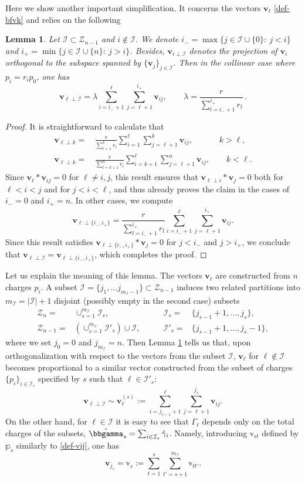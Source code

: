 \documentclass[12pt,letterpaper]{JHEP3}
\def\be{\begin{equation}}
\def\ee{\end{equation}}
\newtheorem{lemma}{Lemma}
\def\({\left(}
\def\){\right)}
\newcommand{\cI}{\mathcal{I}}
\def\Zv{\mathscr{Z}}
\newcommand{\bfv}{{\boldsymbol v}}
\def\hgam{\hat\gamma}
\def\bbp{\mathbb{p}}
\def\bbv{\mathbb{v}}
\def\mI{m_\cI}
\def\hbbgam{\hat\bbgamma}
\begin{document}
Here we show another important simplification. It concerns the vectors $\bfv_\ell$ \eqref{def-bfvk} and relies on the following
\begin{lemma}
	\label{lemma1}
	Let $\cI\subset \Zv_{n-1}$ and $i\notin \cI$. We denote $i_-=\max\{j\in \cI\cup\{0\}:\ j<i\}$
	and $i_+=\min\{j\in \cI\cup\{n\}:\ j>i\}$. Besides, $\bfv_{i\perp \cI}$ denotes the projection of $\bfv_i$ 
	orthogonal to the subspace spanned by $\{\bfv_j\}_{j\in\cI}$.	
	Then in the collinear case where $p_i=r_ip_0$, one has 
	\be
	\bfv_{\ell\perp \cI}=\lambda \sum_{i=i_-+1}^\ell\sum_{j=\ell+1}^{i_+}\bfv_{ij},
	\qquad 
	\lambda=\frac{r}{\sum_{l=i_-+1}^{i_+}r_l}\, .
	\ee
\end{lemma}
\begin{proof}
	It is straightforward to calculate that 
	\be
	\begin{split}
		\bfv_{\ell\perp k} =&\, \frac{r}{\sum_{l=1}^k r_l}\sum_{i=1}^\ell \sum_{j=\ell+1}^k \bfv_{ij},
		\qquad\quad \
		k>\ell,
		\\  
		\bfv_{\ell\perp k} =&\, \frac{r}{\sum_{l=k+1}^n r_l}\sum_{i=k+1}^\ell \sum_{j=\ell+1}^n \bfv_{ij},
		\qquad 
		k<\ell. 
	\end{split}
	\label{iperpj}
	\ee 
	Since $\bfv_\ell\ast\bfv_{ij}=0$ for $\ell\ne i,j$, 
	this result ensures that $\bfv_{\ell\perp i}\ast \bfv_j=0$ both for $\ell<i<j$ and for $j<i<\ell$, and thus already proves the claim
	in the cases of $i_-=0$ and $i_+=n$. In other cases, we compute 
	\be
		\bfv_{\ell\perp \{i_-,i_+\}} = \frac{r}{\sum_{l=i_-+1}^{i_+}r_l}\sum_{i=i_-+1}^\ell\sum_{j=\ell+1}^{i_+}\bfv_{ij}.
	\ee 
	Since this result satisfies $\bfv_{\ell\perp \{i_-,i_+\}}\ast \bfv_j=0$ for $j<i_-$ and $j>i_+$, we conclude that
	$\bfv_{\ell\perp \cI}=\bfv_{\ell\perp \{i_-,i_+\}}$, which completes the proof.
\end{proof}

Let us explain the meaning of this lemma. The vectors $\bfv_\ell$ are constructed from $n$ charges $p_i$. 
A subset $\cI=\{j_1,\dots j_{\mI-1}\}\subset\Zv_{n-1}$ induces two related partitions  
into $\mI=|\cI|+1$ disjoint (possibly empty in the second case) subsets
\be  
\begin{array}{rlrl}
\Zv_n=& \cup_{s=1}^{\mI} \cI_s, 
\qquad&	 
\cI_s=&\{j_{s-1}+1,\dots,j_s\}, 
\\
\Zv_{n-1}=&\(\cup_{s=1}^{\mI} \cI'_s\)\cup\cI,
\qquad&
\cI'_s=&\{j_{s-1}+1,\dots,j_s-1\},
\end{array} 
\label{subsets}
\ee 
where we set $j_0=0$ and $j_{\mI}=n$. 
Then Lemma \ref{lemma1} tells us that, upon orthogonalization with respect to the vectors from the subset $\cI$,
$\bfv_\ell$ for $\ell\notin\cI$
becomes proportional to a similar vector constructed from the subset of charges $\{p_i\}_{i\in\cI_s}$ 
specified by $s$ such that $\ell\in\cI'_s$:
\be 
\bfv_{\ell\perp \cI}\sim \bfv^{(s)}_\ell:=\sum_{i=j_{s-1}+1}^\ell\sum_{j=\ell+1}^{j_s}\bfv_{ij}.
\label{rel-bfvperp}
\ee  
On the other hand, for $\ell\in\cI$ it is easy to see that $\Gamma_\ell$ depends only on the total charges
of the subsets, $\hbbgam_s=\sum_{i\in\cI_s}\hgam_i$.
Namely, introducing $\bbv_{st}$ defined by $\bbp_s$ similarly to \eqref{def-vij}, one has
\be 
\bfv_{j_s}=\bbv_s:=\sum_{t=1}^s\sum_{t'=s+1}^{\mI} \bbv_{tt'}.
\label{def-tbfvs}
\ee 
\end{document}
